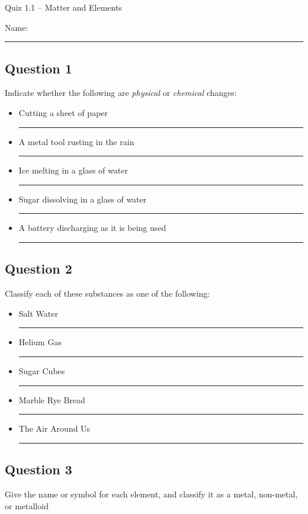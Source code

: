\documentclass[11pt, letterpaper]{memoir}
\begin{document}
	\begin{center}
		{\large Quiz 1.1 --	Matter and Elements }
	\end{center}
	{\large Name: \rule[-1mm]{4in}{.1pt} 
	\subsection*{Question 1}
	Indicate whether the following are \emph{physical} or \emph{chemical} changes:
	\begin{itemize}
		\item Cutting a sheet of paper \rule[-2pt]{8em}{1pt}
		\item A metal tool rusting in the rain \rule[-2pt]{8em}{1pt}
		\item Ice melting in a glass of water \rule[-2pt]{8em}{1pt}
		\item Sugar dissolving in a glass of water \rule[-2pt]{8em}{1pt}
		\item A battery discharging as it is being used \rule[-2pt]{8em}{1pt}
	\end{itemize}
	\subsection*{Question 2}
	Classify each of these substances as one of the following:
	
	
	\begin{itemize}
		\item Salt Water \rule[-2pt]{12em}{1pt}
		\item Helium Gas \rule[-2pt]{12em}{1pt}
		\item Sugar Cubes \rule[-2pt]{12em}{1pt}
		\item Marble Rye Bread \rule[-2pt]{12em}{1pt}
		\item The Air Around Us \rule[-2pt]{12em}{1pt}
	\end{itemize}
	\subsection*{Question 3}
	Give the name or symbol for each element, and classify it as a metal, non-metal, or metalloid
	
}
\end{document}

